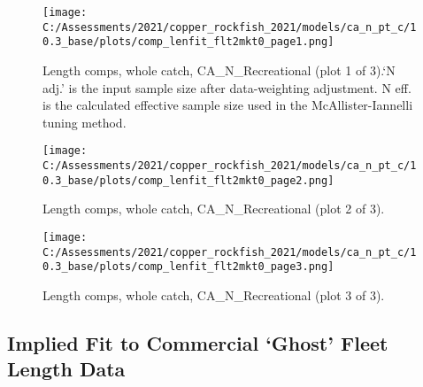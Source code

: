 \documentclass[11pt,
  english,
  a4paper,
]{article}
\begin{document}
\tagmcend\tagstructend


\begin{figure}
\centering
\texttt{[image: C:/Assessments/2021/copper\_rockfish\_2021/models/ca\_n\_pt\_c/10.3\_base/plots/comp\_lenfit\_flt2mkt0\_page1.png]}
\caption{Length comps, whole catch, CA\_N\_Recreational (plot 1 of 3).`N adj.' is the input sample size after data-weighting adjustment. N eff. is the calculated effective sample size used in the McAllister-Iannelli tuning method.\label{fig:comp_lenfit_flt2mkt0_page1}}
\end{figure}

\tagmcend\tagstructend


\begin{figure}
\centering
\texttt{[image: C:/Assessments/2021/copper\_rockfish\_2021/models/ca\_n\_pt\_c/10.3\_base/plots/comp\_lenfit\_flt2mkt0\_page2.png]}
\caption{Length comps, whole catch, CA\_N\_Recreational (plot 2 of 3).\label{fig:comp_lenfit_flt2mkt0_page2}}
\end{figure}

\tagmcend\tagstructend


\begin{figure}
\centering
\texttt{[image: C:/Assessments/2021/copper\_rockfish\_2021/models/ca\_n\_pt\_c/10.3\_base/plots/comp\_lenfit\_flt2mkt0\_page3.png]}
\caption{Length comps, whole catch, CA\_N\_Recreational (plot 3 of 3).\label{fig:comp_lenfit_flt2mkt0_page3}}
\end{figure}

\tagmcend\tagstructend

\newpage


\hypertarget{implied-fit-to-commercial-ghost-fleet-length-data}{%
\subsection{Implied Fit to Commercial `Ghost' Fleet Length Data}\label{implied-fit-to-commercial-ghost-fleet-length-data}}

\leavevmode\tagmcend\tagstructend
\end{document}
